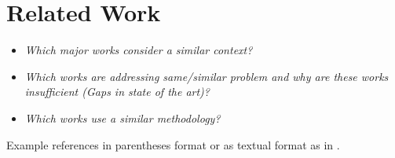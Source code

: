 \section{Related Work}
\label{sec:Related Work}

\begin{itemize}
	\item \emph{Which major works consider a similar context?}
	\item \emph{Which works are addressing same/similar problem and why are these works insufficient (Gaps in state of the art)?}
	\item \emph{Which works use a similar methodology?}
\end{itemize}

Example references in parentheses format \citep{Raibert1986LeggedRobotsThatBalance, Vukobratovic2004ZeroMomentPoint} or as textual format as in \citet{Pratt1995SEA}.
